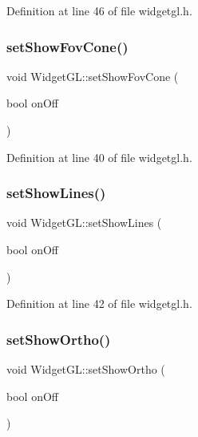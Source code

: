 Definition at line 46 of file widgetgl.\+h.

\mbox{\label{class_widget_g_l_ad4d9dddefbef9480543df7bb9e29990e}} 
\subsubsection{\texorpdfstring{setShowFovCone()}{setShowFovCone()}}
{\footnotesize\ttfamily void Widget\+G\+L\+::set\+Show\+Fov\+Cone (\begin{DoxyParamCaption}\item[{bool}]{on\+Off }\end{DoxyParamCaption})\hspace{0.3cm}{\ttfamily [inline]}}



Definition at line 40 of file widgetgl.\+h.

\mbox{\label{class_widget_g_l_a2d736838c2b753ade50043c99558af40}} 
\subsubsection{\texorpdfstring{setShowLines()}{setShowLines()}}
{\footnotesize\ttfamily void Widget\+G\+L\+::set\+Show\+Lines (\begin{DoxyParamCaption}\item[{bool}]{on\+Off }\end{DoxyParamCaption})\hspace{0.3cm}{\ttfamily [inline]}}



Definition at line 42 of file widgetgl.\+h.

\mbox{\label{class_widget_g_l_a72cf721826edf788dc0b2331e23b548d}} 
\subsubsection{\texorpdfstring{setShowOrtho()}{setShowOrtho()}}
{\footnotesize\ttfamily void Widget\+G\+L\+::set\+Show\+Ortho (\begin{DoxyParamCaption}\item[{bool}]{on\+Off }\end{DoxyParamCaption})\hspace{0.3cm}{\ttfamily [inline]}}



